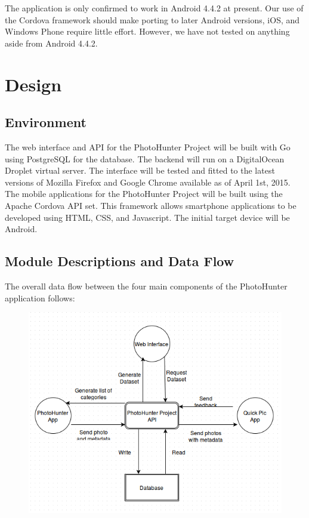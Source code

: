 \documentclass{article}
\begin{document}
The application is only confirmed to work in Android 4.4.2 at present. Our use
of the Cordova framework should make porting to later Android versions, iOS,
and Windows Phone require little effort. However, we have not tested on
anything aside from Android 4.4.2.




\section{Design}
\subsection{Environment}
The web interface and API for the PhotoHunter Project will be built with Go
using PostgreSQL for the database. The backend will run on a DigitalOcean
Droplet virtual server. The interface will be tested and fitted to the latest
versions of Mozilla Firefox and Google Chrome available as of April 1st,
2015. The mobile applications for the PhotoHunter Project will be built using
the Apache Cordova API set. This framework allows smartphone applications to be
developed using HTML, CSS, and Javascript. The initial target device will be
Android.

\subsection{Module Descriptions and Data Flow}
The overall data flow between the four main components of the PhotoHunter
application follows:
\begin{figure}
  \centering
  \includegraphics[scale = 0.5]{ss_flowchart}
\end{figure}
\end{document}
